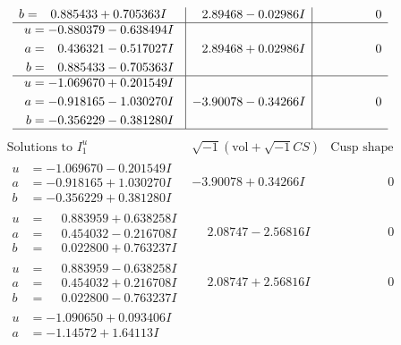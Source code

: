 \documentclass[1p]{elsarticle_modified}
\theoremstyle{definition}
\newcommand{\I}{\sqrt{-1}}
\begin{document}
$$\begin{array}{c|c|c}
\begin{aligned}
b &= \phantom{-}0.885433 + 0.705363 I\end{aligned}
 & \phantom{-}2.89468 - 0.02986 I & \phantom{-0.000000 } 0 \\ \hline\begin{aligned}
u &= -0.880379 - 0.638494 I \\
a &= \phantom{-}0.436321 - 0.517027 I \\
b &= \phantom{-}0.885433 - 0.705363 I\end{aligned}
 & \phantom{-}2.89468 + 0.02986 I & \phantom{-0.000000 } 0 \\ \hline\begin{aligned}
u &= -1.069670 + 0.201549 I \\
a &= -0.918165 - 1.030270 I \\
b &= -0.356229 - 0.381280 I\end{aligned}
 & -3.90078 - 0.34266 I & \phantom{-0.000000 } 0\\
 \hline 
 \end{array}$$\newpage$$\begin{array}{c|c|c}  
\text{Solutions to }I^u_{1}& \I (\text{vol} + \sqrt{-1}CS) & \text{Cusp shape}\\
 \hline 
\begin{aligned}
u &= -1.069670 - 0.201549 I \\
a &= -0.918165 + 1.030270 I \\
b &= -0.356229 + 0.381280 I\end{aligned}
 & -3.90078 + 0.34266 I & \phantom{-0.000000 } 0 \\ \hline\begin{aligned}
u &= \phantom{-}0.883959 + 0.638258 I \\
a &= \phantom{-}0.454032 - 0.216708 I \\
b &= \phantom{-}0.022800 + 0.763237 I\end{aligned}
 & \phantom{-}2.08747 - 2.56816 I & \phantom{-0.000000 } 0 \\ \hline\begin{aligned}
u &= \phantom{-}0.883959 - 0.638258 I \\
a &= \phantom{-}0.454032 + 0.216708 I \\
b &= \phantom{-}0.022800 - 0.763237 I\end{aligned}
 & \phantom{-}2.08747 + 2.56816 I & \phantom{-0.000000 } 0 \\ \hline\begin{aligned}
u &= -1.090650 + 0.093406 I \\
a &= -1.14572 + 1.64113 I \\

\end{aligned}
\end{array}$$
\end{document}
